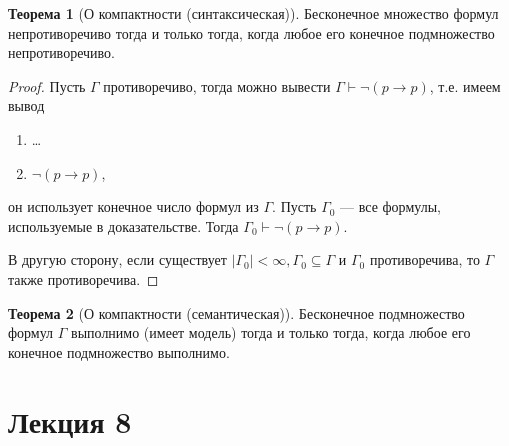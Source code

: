 \documentclass[12pt]{article}
\let\im\rightarrow
\let\n\neg
\theoremstyle{definition}
\newtheorem{theorem}{Теорема}[section]
\theoremstyle{statement}
\theoremstyle{theorem}
\begin{document}
\begin{theorem}[О компактности (синтаксическая)]
  Бесконечное множество формул непротиворечиво тогда и только тогда,
  когда любое его конечное подмножество непротиворечиво.
  \begin{proof}
    Пусть $\Gamma$ противоречиво, тогда можно вывести $\Gamma \vdash
    \n (p \im p)$, т.е. имеем вывод
    \begin{enumerate}
      \item \dots

      \item $\n (p \im p)$,
    \end{enumerate}
    он использует конечное число формул из $\Gamma$. Пусть $\Gamma_0$
    --- все формулы, используемые в доказательстве. Тогда $\Gamma_0
    \vdash \n (p \im p)$.

    В другую сторону, если существует $|\Gamma_0| < \infty, \Gamma_0
    \subseteq \Gamma$ и $\Gamma_0$ противоречива, то $\Gamma$ также
    противоречива.
  \end{proof}
\end{theorem}

\begin{theorem}[О компактности (семантическая)]
  Бесконечное подмножество формул $\Gamma$ выполнимо (имеет модель)
  тогда и только тогда, когда любое его конечное подмножество выполнимо.
\end{theorem}
\pagebreak

\section{Лекция 8}
\end{document}
